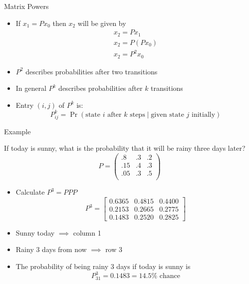 \documentclass[10pt]{beamer}
\begin{document}
\begin{frame}{Matrix Powers}
\begin{itemize}
    \item If $x_1=Px_0$ then $x_2$ will be given by 
    \begin{align*}
        x_2 = Px_1 \\
        x_2 = P(Px_0)\\
        x_2 = P^2 x_0
    \end{align*}
    \item $P^2$ describes probabilities after two transitions
    \item In general $P^k$ describes probabilities after $k$ transitions
    \item Entry $(i,j)$ of $P^k$ is:
    \[
    P_{ij}^k=\Pr(\text{state } i \text{ after } k \text{ steps} \mid \text{given } \text{state } j \text{ initially})
    \]
\end{itemize}

\end{frame}

\begin{frame}{Example}

\begin{example}
If today is sunny, what is the probability that it will be rainy three days later?   
$$P =
\left(%
\begin{array}{lll}
  .8 & .3 & .2 \\
  .15 & .4 & .3 \\
  .05 & .3 & .5 \\
\end{array}%
\right)
$$
\end{example}

\begin{itemize}
    \item Calculate $P^3=PPP$
    $$
    P^3=\begin{bmatrix}
    0.6365  &  0.4815 &   0.4400\\
    0.2153  &  0.2665 &   0.2775\\
    0.1483  &  0.2520 &   0.2825
    \end{bmatrix} 
    $$
    \item Sunny today $\implies$ column 1
    \item Rainy 3 days from now $\implies $ row 3
    \item The probability of being rainy 3 days if today is sunny is 
    $$P^3_{31} = 0.1483= 14.5\% \text{ chance}$$
\end{itemize}
\end{frame}
\end{document}
